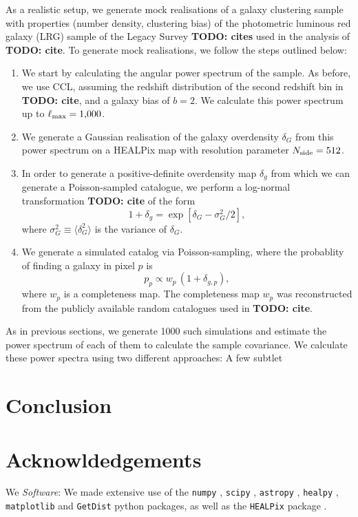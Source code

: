 \documentclass[aps,twocolumn, superscriptaddress, english, nofootinbib, 10pt]{revtex4-2}
\newcommand{\todo}[1]{{\color{blue}\bf TODO: #1}}
\begin{document}
    As a realistic setup, we generate mock realisations of a galaxy clustering sample with properties (number density, clustering bias) of the photometric luminous red galaxy (LRG) sample of the Legacy Survey \todo{cites} used in the analysis of \todo{cite}. To generate mock realisations, we follow the steps outlined below:
    \begin{enumerate}
      \item We start by calculating the angular power spectrum of the sample. As before, we use CCL, assuming the redshift distribution of the second redshift bin in \todo{cite}, and a galaxy bias of $b=2$. We calculate this power spectrum up to $\ell_{\rm max}=1{,}000$.
      \item We generate a Gaussian realisation of the galaxy overdensity $\delta_G$ from this power spectrum on a HEALPix map with resolution parameter $N_{\rm side}=512$.
      \item In order to generate a positive-definite overdensity map $\delta_g$ from which we can generate a Poisson-sampled catalogue, we perform a log-normal transformation \todo{cite} of the form
      \begin{equation}
        1+\delta_g=\exp[\delta_G-\sigma_G^2/2],
      \end{equation}
      where $\sigma_G^2\equiv\langle\delta_G^2\rangle$ is the variance of $\delta_G$.
      \item We generate a simulated catalog via Poisson-sampling, where the probablity of finding a galaxy in pixel $p$ is
      \begin{equation}
        p_p\propto w_p\,(1+\delta_{g,p}),
      \end{equation}
      where $w_p$ is a completeness map. The completeness map $w_p$ was reconstructed from the publicly available random catalogues used in \todo{cite}.
    \end{enumerate}
    As in previous sections, we generate 1000 such simulations and estimate the power spectrum of each of them to calculate the sample covariance. We calculate these power spectra using two different approaches: 
    A few subtlet
 

\section{Conclusion}\label{sec:conc}
    \lipsum[11]

\section*{Acknowldedgements}
  We
\emph{Software}:  We made extensive use of the {\tt numpy} \citep{oliphant2006guide, van2011numpy}, {\tt scipy} \citep{2020SciPy-NMeth}, {\tt astropy} \citep{1307.6212, 1801.02634}, {\tt healpy} \citep{Zonca2019}, {\tt matplotlib} \citep{2007CSE.....9...90H} and {\tt GetDist} \citep{Lewis:2019xzd} python packages, as well as the {\tt HEALPix} package \cite{astro-ph/0409513}.
\end{document}

